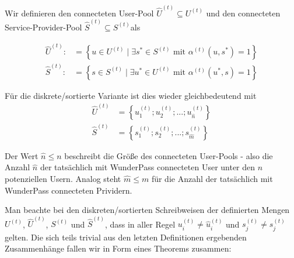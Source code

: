 \begin{Def}\label{defPools}

Wir definieren den connecteten User-Pool $\widehat{U}^{(t)} \subseteq U^{(t)}$ und den connecteten Service-Provider-Pool $\widehat{S}^{(t)} \subseteq S^{(t)}$als

\begin{align}
\widehat{U}^{(t)}:&= \left\{u \in U^{(t)} \mid \exists s^{*} \in S^{(t)} \textrm{ mit } \alpha^{(t)}(u, s^{*}) = 1 \right\} \tag{i} \\ 
\widehat{S}^{(t)}:&= \left\{s \in S^{(t)} \mid \exists u^{*} \in U^{(t)} \textrm{ mit } \alpha^{(t)}(u^{*}, s) = 1 \right\} \tag{ii}
\end{align}

\vspace{0.3cm}

Für die diskrete/sortierte Variante ist dies wieder gleichbedeutend mit
\begin{align}
\widehat{U}^{(t)} &= \left\{ u^{(t)}_1; u^{(t)}_2;...; u^{(t)}_{\widehat{n}} \right\} \tag{iii} \\ 
\widehat{S}^{(t)} &= \left\{ s^{(t)}_1; s^{(t)}_2;...; s^{(t)}_{\widehat{m}}\right\} \tag{iv}
\end{align}

\vspace{0.6cm}

Der Wert $\widehat{n} \leq n$ beschreibt die Größe des connecteten User-Pools - also die Anzahl $\widehat{n}$ der tatsächlich mit WunderPass connecteten User unter den $n$ potenziellen Usern. Analog steht $\widehat{m} \leq m$ für die Anzahl der tatsächlich mit WunderPass connecteten Prividern.

\end{Def}

\vspace{0.6cm}

Man beachte bei den diskreten/sortierten Schreibweisen der definierten Mengen $U^{(t)}$, $\widehat{U}^{(t)}$, $S^{(t)}$ und $\widehat{S}^{(t)}$, dass in aller Regel $u^{(t)}_i \neq \widehat{u}^{(t)}_i$ und $s^{(t)}_j \neq \widehat{s}^{(t)}_j$ gelten. Die sich teils trivial aus den letzten Definitionen ergebenden Zusammenhänge fallen wir in Form eines Theorems zusammen:

\vspace{0.3cm}

